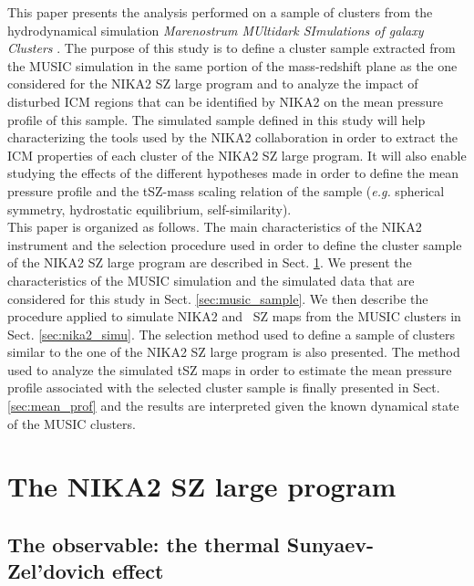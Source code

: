 \documentclass[twocolumn,traditabstract]{aa}
\begin{document}
\indent This paper presents the analysis performed on a sample of clusters from the hydrodynamical simulation \emph{Marenostrum MUltidark SImulations of galaxy Clusters} \citep[MUSIC;][]{sem12}. The purpose of this study is to define a cluster sample extracted from the MUSIC simulation in the same portion of the mass-redshift plane as the one considered for the NIKA2 SZ large program and to analyze the impact of disturbed ICM regions that can be identified by NIKA2 on the mean pressure profile of this sample. The simulated sample defined in this study will help characterizing the tools used by the NIKA2 collaboration in order to extract the ICM properties of each cluster of the NIKA2 SZ large program. It will also enable studying the effects of the different hypotheses made in order to define the mean pressure profile and the tSZ-mass scaling relation of the sample (\emph{e.g.} spherical symmetry, hydrostatic equilibrium, self-similarity).\\
\indent This paper is organized as follows. The main characteristics of the NIKA2 instrument and the selection procedure used in order to define the cluster sample of the NIKA2 SZ large program are described in Sect. \ref{sec:nika2_szlp}. We present the characteristics of the MUSIC simulation and the simulated data that are considered for this study in Sect. \ref{sec:music_sample}. We then describe the procedure applied to simulate NIKA2 and \planck\ SZ maps from the MUSIC clusters in Sect. \ref{sec:nika2_simu}. The selection method used to define a sample of clusters similar to the one of the NIKA2 SZ large program is also presented. The method used to analyze the simulated tSZ maps in order to estimate the mean pressure profile associated with the selected cluster sample is finally presented in Sect. \ref{sec:mean_prof} and the results are interpreted given the known dynamical state of the MUSIC clusters.

\section{The NIKA2 SZ large program}\label{sec:nika2_szlp}

\subsection{The observable: the thermal Sunyaev-Zel'dovich effect}\label{subsec:tSZ_effect}
\end{document}
